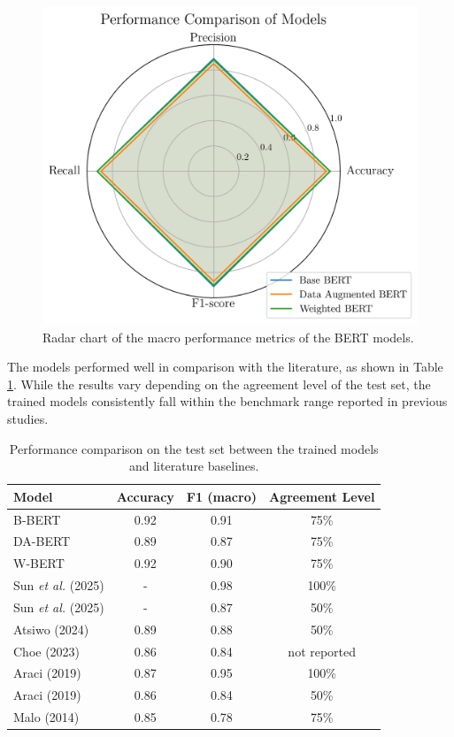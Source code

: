 \documentclass[conference]{IEEEtran}
\begin{document}
\begin{figure}[H]
    \centering
    \includegraphics[width=1\linewidth]{assets/results_radarchart.png}
    \caption{Radar chart of the macro performance metrics of the BERT models.}
    \label{fig:results_radarchart}
\end{figure}

The models performed well in comparison with the literature, as shown in Table \ref{results_table}. While the results vary depending on the agreement level of the test set, the trained models consistently fall within the benchmark range reported in previous studies.

\begin{table}[H]
\centering
\caption{Performance comparison on the test set between the trained models and literature baselines.}
\label{results_table}
\begin{tabular}{lccc}
\toprule
\textbf{Model} & \textbf{Accuracy} & \textbf{F1 (macro)} & \textbf{Agreement Level} \\
\midrule
B-BERT & 0.92 & 0.91 & 75\% \\
DA-BERT & 0.89 & 0.87 & 75\% \\
W-BERT & 0.92 & 0.90 & 75\% \\
\midrule
Sun \textit{et al.} (2025) & - & 0.98 & 100\% \\
Sun \textit{et al.} (2025) & - & 0.87 & 50\% \\
Atsiwo (2024) & 0.89 & 0.88 & 50\% \\
Choe (2023) & 0.86 & 0.84 & not reported \\
Araci (2019) & 0.87 & 0.95 & 100\% \\
Araci (2019) & 0.86 & 0.84 & 50\% \\
Malo (2014) & 0.85 & 0.78 & 75\% \\
\bottomrule
\end{tabular}
\end{table}
\end{document}
